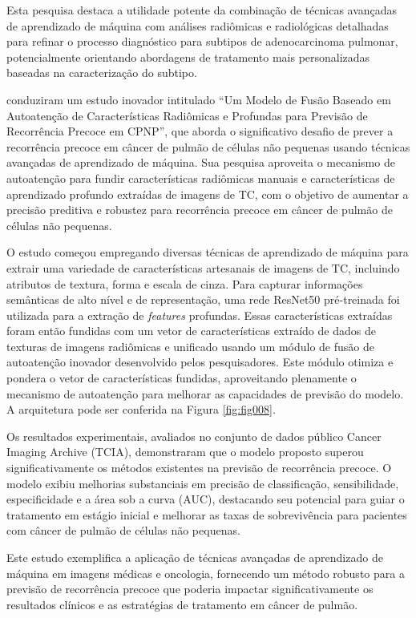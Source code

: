 Esta pesquisa destaca a utilidade potente da combinação de técnicas avançadas de aprendizado de máquina com análises radiômicas e radiológicas detalhadas para refinar o processo diagnóstico para subtipos de adenocarcinoma pulmonar, potencialmente orientando abordagens de tratamento mais personalizadas baseadas na caracterização do subtipo.

 \cite{aiSelfAttentionBasedFusion2023} conduziram um estudo inovador intitulado ``Um Modelo de Fusão Baseado em Autoatenção de Características Radiômicas e Profundas para Previsão de Recorrência Precoce em CPNP'', que aborda o significativo desafio de prever a recorrência precoce em câncer de pulmão de células não pequenas usando técnicas avançadas de aprendizado de máquina. Sua pesquisa aproveita o mecanismo de autoatenção para fundir características radiômicas manuais e características de aprendizado profundo extraídas de imagens de TC, com o objetivo de aumentar a precisão preditiva e robustez para recorrência precoce em câncer de pulmão de células não pequenas.

O estudo começou empregando diversas técnicas de aprendizado de máquina para extrair uma variedade de características artesanais de imagens de TC, incluindo atributos de textura, forma e escala de cinza. Para capturar informações semânticas de alto nível e de representação, uma rede ResNet50 pré-treinada foi utilizada para a extração de \textit{features} profundas. Essas características extraídas foram então fundidas com um vetor de características extraído de dados de texturas de imagens radiômicas e unificado usando um módulo de fusão de autoatenção inovador desenvolvido pelos pesquisadores. Este módulo otimiza e pondera o vetor de características fundidas, aproveitando plenamente o mecanismo de autoatenção para melhorar as capacidades de previsão do modelo. A arquitetura pode ser conferida na Figura \ref{fig:fig008}.

Os resultados experimentais, avaliados no conjunto de dados público Cancer Imaging Archive (TCIA), demonstraram que o modelo proposto superou significativamente os métodos existentes na previsão de recorrência precoce. O modelo exibiu melhorias substanciais em precisão de classificação, sensibilidade, especificidade e a área sob a curva (AUC), destacando seu potencial para guiar o tratamento em estágio inicial e melhorar as taxas de sobrevivência para pacientes com câncer de pulmão de células não pequenas.

Este estudo exemplifica a aplicação de técnicas avançadas de aprendizado de máquina em imagens médicas e oncologia, fornecendo um método robusto para a previsão de recorrência precoce que poderia impactar significativamente os resultados clínicos e as estratégias de tratamento em câncer de pulmão.


